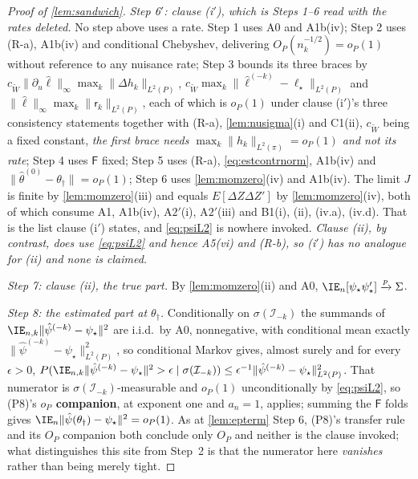 \begin{proof}[Proof of \cref{lem:sandwich}]
\emph{Step 6$'$: clause \textup{(i$'$)}, which is Steps 1--6 read with the rates deleted.} No step above uses
a rate. Step 1 uses A0 and A1b(iv); Step 2 uses (R-a), A1b(iv) and conditional Chebyshev, delivering
$O_P(n_k^{-1/2})=o_P(1)$ without reference to any nuisance rate; Step 3 bounds its three braces by
$c_{\widetilde W}\|\partial_u\hat\ell\|_\infty\max_k\|\Delta h_k\|_{L^{2}(P)}$,
$c_{\widetilde W}\max_k\|\hat\ell^{(-k)}-\ell_\star\|_{L^{2}(P)}$ and
$\|\hat\ell\|_\infty\max_k\|\mathsf r_k\|_{L^{2}(P)}$,
each of which is $o_P(1)$ under clause (i$'$)'s three consistency statements together with (R-a),
\cref{lem:nusigma}(i) and C1(ii), $c_{\widetilde W}$ being a fixed constant, \emph{the first brace needs
$\max_k\|h_k\|_{L^{2}(\pi)}=o_P(1)$ and not
its rate}; Step 4 uses $\mathsf F$ fixed; Step 5 uses (R-a), \eqref{eq:estcontrnorm}, A1b(iv) and
$\|\hat\theta^{(0)}-\theta_\dagger\|=o_P(1)$; Step 6 uses \cref{lem:momzero}\textup{(iv)} and A1b(iv).
The limit $J$ is finite by
\cref{lem:momzero}(iii) and equals $E[\Delta Z\Delta Z']$ by \cref{lem:momzero}(iv), both of which consume
A1, A1b(iv), A$2'$(i), A$2'$(iii) and B1(i), (ii), (iv.a), (iv.d). That is
the list clause (i$'$) states, and \eqref{eq:psiL2} is nowhere invoked. \emph{Clause \textup{(ii)}, by
contrast, does use \eqref{eq:psiL2} and hence A5(vi) and (R-b), so (i$'$) has no analogue for (ii) and
none is claimed.}

\emph{Step 7: clause \textup{(ii)}, the true part.} By \cref{lem:momzero}(ii) and A0,
$\IE_n[\psi_\star\psi_\star']\xrightarrow{p}\Sigma$.

\emph{Step 8: the estimated part at $\theta_\dagger$.} Conditionally on $\sigma(\mathcal I_{-k})$ the summands of
$\IE_{n,k}\|\hat\psi^{(-k)}-\psi_\star\|^{2}$ are i.i.d.\ by A0, nonnegative, with conditional mean
exactly $\|\hat\psi^{(-k)}-\psi_\star\|^{2}_{L^{2}(P)}$, so conditional Markov gives, almost surely and for
every $\epsilon>0$,
$P(\IE_{n,k}\|\hat\psi^{(-k)}-\psi_\star\|^{2}>\epsilon\mid\sigma(\mathcal I_{-k}))
\le\epsilon^{-1}\|\hat\psi^{(-k)}-\psi_\star\|^{2}_{L^{2}(P)}$. That numerator is
$\sigma(\mathcal I_{-k})$-measurable and $o_P(1)$ unconditionally by \eqref{eq:psiL2}, so \textup{(P8)}'s
\textbf{$o_P$ companion}, at exponent one and $a_n=1$, applies; summing the $\mathsf F$ folds gives
$\IE_n\|\hat\psi(\theta_\dagger)-\psi_\star\|^{2}=o_P(1)$. As at \cref{lem:epterm} Step 6,
\textup{(P8)}'s transfer rule and its $O_P$ companion both conclude only $O_P$ and neither is the clause
invoked; what distinguishes this site from Step~2 is that the numerator here \emph{vanishes} rather than
being merely tight.


\end{proof}

